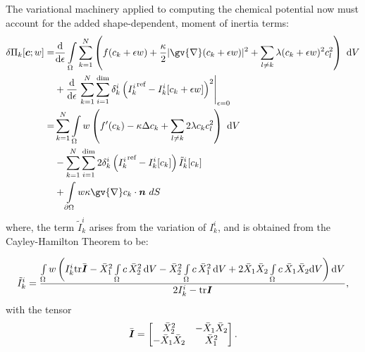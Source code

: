 \documentclass{article}
\newcommand{\grad}[1]{\gv{\nabla} #1}
\def\bI{\mbox{\boldmath$ I$}}
\def\bc{\mbox{\boldmath$ c$}}
\def\bn{\mbox{\boldmath$ n$}}
\begin{document}
The variational machinery applied to computing the chemical potential now must account for the added shape-dependent, moment of inertia terms:
\begin{align}
\delta \Pi_k[\bc;w]=  &\frac{\text{d}}{\text{d}\epsilon} \int\limits_{\Omega} \sum_{k=1}^{N}\left( f(c_k+\epsilon w) + \frac{\kappa}{2}\vert\grad (c_k+\epsilon w)\vert^2 + \sum_{l\ne k}\lambda (c_k+\epsilon w)^2 c_l^2 \right) ~\text{d}V \nonumber\\
&+ \frac{\text{d}}{\text{d}\epsilon}\left. \sum_{k=1}^{N}\sum_{i=1}^{\text{dim}}\delta_k^i \left({I_k^i} ^\text{ref}-I^i_k[c_k+\epsilon w]\right)^2 \right\vert_{\epsilon=0} \nonumber\\
= &\sum_{k=1}^{N} \int\limits_{\Omega} w \left( {f^\prime}(c_k) -  \kappa \Delta  c_k  + \sum_{l\ne k}2\lambda  c_k c_l^2 \right) ~\text{d}V \nonumber \\
&- \sum_{k=1}^N\sum_{i=1}^{\text{dim}} 2\delta_k^i \left({I_k^i} ^\text{ref} - I_k^i[c_k]\right)\tilde{I}^i_k[c_k] \nonumber	\\
&+ \int\limits_{\partial \Omega}   w \kappa \grad c_k \cdot \bn   ~dS
\end{align}
where, the term $\tilde{I}^i_k$ arises from the variation of $I^i_k$, and is obtained from the Cayley-Hamilton Theorem to be:

\begin{equation}
    \tilde{I}^i_k = \frac{\int\limits_\Omega w\left(I^i_k\text{tr}\bar{\bI}-\bar{X}_1^2\int\limits_\Omega c\,\bar{X}_2^2\,\text{d}V -\bar{X}_2^2\int\limits_\Omega c\,\bar{X}_1^2\,\text{d}V+2\bar{X}_1\bar{X}_2\int\limits_\Omega c\,\bar{X}_1\bar{X}_2\text{d}V\right)\text{d}V}{2 I^i_k - \text{tr}\bI},
    \label{equ:CayleyHamilton}
\end{equation}
with the tensor 
\begin{equation}
    \bar{\bI} = 
    \begin{bmatrix}
\bar{X}_2^2   & -\bar{X}_1 \bar{X}_2\\
-\bar{X}_1 \bar{X}_2 & \bar{X}_1^2
\end{bmatrix}.
\label{equ:barI}
\end{equation}
\end{document}
